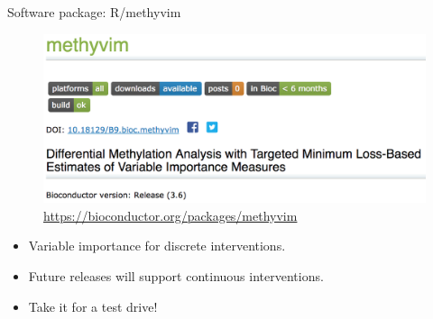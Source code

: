 \documentclass[12pt,t]{beamer}
\begin{document}
\begin{frame}[c]{Software package: R/methyvim}

\begin{figure}[H]
  \centering
  \includegraphics[width=\textwidth]{methyvim_bioc}
  \caption{
    \url{https://bioconductor.org/packages/methyvim}
  }
\end{figure}

\begin{center}
\begin{itemize}
  \itemsep4pt
  \item Variable importance for discrete interventions.
  \item Future releases will support continuous interventions.
  \item Take it for a test drive!
\end{itemize}
\end{center}


\end{frame}

\end{document}
